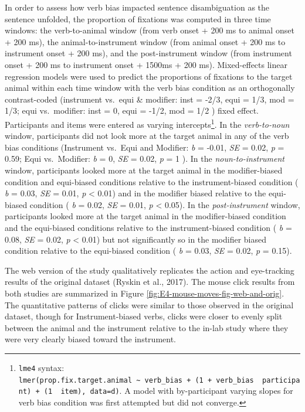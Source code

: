 \documentclass[
  man,floatsintext]{apa6}
\begin{document}
In order to assess how verb bias impacted sentence disambiguation as the sentence unfolded, the proportion of fixations was computed in three time windows: the verb-to-animal window (from verb onset + 200 ms to animal onset + 200 ms), the animal-to-instrument window (from animal onset + 200 ms to instrument onset + 200 ms), and the post-instrument window (from instrument onset + 200 ms to instrument onset + 1500ms + 200 ms). Mixed-effects linear regression models were used to predict the proportions of fixations to the target animal within each time window with the verb bias condition as an orthogonally contrast-coded (instrument vs.~equi \& modifier: inst = -2/3, equi = 1/3, mod = 1/3; equi vs.~modifier: inst = 0, equi = -1/2, mod = 1/2 ) fixed effect. Participants and items were entered as varying intercepts\footnote{\texttt{lme4} syntax: \texttt{lmer(prop.fix.target.animal\ \textasciitilde{}\ verb\_bias\ +\ (1\ +\ verb\_bias\ \textbar{}\ participant)\ +\ (1\ \textbar{}\ item),\ data=d)}. A model with by-participant varying slopes for verb bias condition was first attempted but did not converge.}. In the \emph{verb-to-noun} window, participants did not look more at the target animal in any of the verb bias conditions (Instrument vs.~Equi and Modifier: \emph{b} = -0.01, \emph{SE} = 0.02, \emph{p} = 0.59; Equi vs.~Modifier: \emph{b} = 0, \emph{SE} = 0.02, \emph{p} = 1 ). In the \emph{noun-to-instrument} window, participants looked more at the target animal in the modifier-biased condition and equi-biased conditions relative to the instrument-biased condition ( \emph{b} = 0.03, \emph{SE} = 0.01, \emph{p} \textless{} 0.01) and in the modifier biased relative to the equi-biased condition ( \emph{b} = 0.02, \emph{SE} = 0.01, \emph{p} \textless{} 0.05). In the \emph{post-instrument} window, participants looked more at the target animal in the modifier-biased condition and the equi-biased conditions relative to the instrument-biased condition ( \emph{b} = 0.08, \emph{SE} = 0.02, \emph{p} \textless{} 0.01) but not significantly so in the modifier biased condition relative to the equi-biased condition ( \emph{b} = 0.03, \emph{SE} = 0.02, \emph{p} = 0.15).

The web version of the study qualitatively replicates the action and eye-tracking results of the original dataset (Ryskin et al., 2017).
The mouse click results from both studies are summarized in Figure \ref{fig:E4-mouse-moves-fig-web-and-orig}.
The quantitative patterns of clicks were similar to those observed in the original dataset, though for Instrument-biased verbs, clicks were closer to evenly split between the animal and the instrument relative to the in-lab study where they were very clearly biased toward the instrument.
\end{document}
